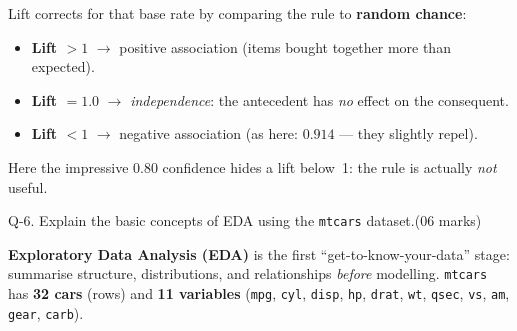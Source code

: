 \documentclass[11pt,a4paper]{article}
\newcommand{\question}[3][05 marks]{%
  \begin{qbox}#2\hfill\textcolor{accent}{(#1)}\\[2pt]#3\end{qbox}%
}
\begin{document}
\begin{conceptbox}
Lift corrects for that base rate by comparing the rule to \textbf{random chance}:
\begin{itemize}[leftmargin=*,topsep=1pt]
  \item \textbf{Lift $>1$} $\rightarrow$ positive association (items bought together more than expected).
  \item \textbf{Lift $=1.0$} $\rightarrow$ \emph{independence}: the antecedent has \emph{no} effect on the consequent.
  \item \textbf{Lift $<1$} $\rightarrow$ negative association (as here: $0.914$ --- they slightly repel).
\end{itemize}
Here the impressive 0.80 confidence hides a lift below~1: the rule is actually \emph{not} useful.
\end{conceptbox}

\question[06 marks]{Q-6. Explain the basic concepts of EDA using the \texttt{mtcars} dataset.}{}

\textbf{Exploratory Data Analysis (EDA)} is the first ``get-to-know-your-data'' stage: summarise structure, distributions, and relationships \emph{before} modelling. \texttt{mtcars} has \textbf{32 cars} (rows) and \textbf{11 variables} (\texttt{mpg}, \texttt{cyl}, \texttt{disp}, \texttt{hp}, \texttt{drat}, \texttt{wt}, \texttt{qsec}, \texttt{vs}, \texttt{am}, \texttt{gear}, \texttt{carb}).
\end{document}
